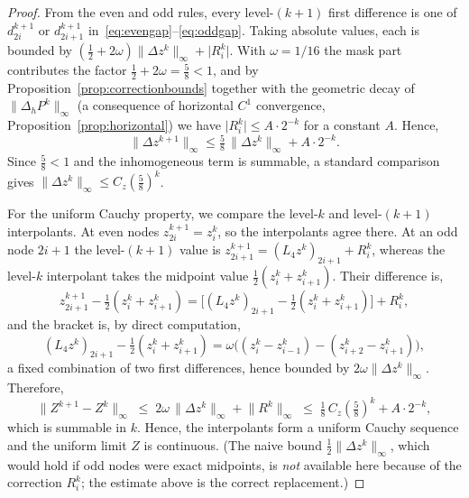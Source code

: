 \documentclass[10pt,a4paper]{amsart}
\newcommand{\Dh}{\Delta_h}
\newcommand{\Lop}{L_4}
\newcommand{\abs}[1]{\lvert #1 \rvert}
\newcommand{\norm}[1]{\lVert #1 \rVert}
\begin{document}
\begin{proof}
From the even and odd rules, every level-$(k+1)$ first difference is one of
$d_{2i}^{k+1}$ or $d_{2i+1}^{k+1}$ in~\eqref{eq:evengap}--\eqref{eq:oddgap}.
Taking absolute values, each is bounded by
$(\tfrac12+2\omega)\norm{\Delta z^k}_\infty+\abs{R_i^k}$. With $\omega=1/16$
the mask part contributes the factor $\tfrac12+2\omega=\tfrac58<1$, and by
Proposition~\ref{prop:correctionbounds} together with the geometric decay of
$\norm{\Dh P^k}_\infty$ (a consequence of horizontal $C^1$ convergence,
Proposition~\ref{prop:horizontal}) we have $\abs{R_i^k}\leq A\cdot 2^{-k}$ for a
constant $A$. Hence,
\[
  \norm{\Delta z^{k+1}}_\infty
  \leq \tfrac58\,\norm{\Delta z^k}_\infty + A\cdot 2^{-k}.
\]
Since $\tfrac58<1$ and the inhomogeneous term is summable, a standard comparison
gives $\norm{\Delta z^k}_\infty\leq C_z(\tfrac58)^k$.

For the uniform Cauchy property, we compare the level-$k$ and level-$(k+1)$
interpolants. At even nodes $z_{2i}^{k+1}=z_i^k$, so the interpolants agree
there. At an odd node $2i+1$ the level-$(k+1)$ value is
$z_{2i+1}^{k+1}=(\Lop z^k)_{2i+1}+R_i^k$, whereas the level-$k$ interpolant
takes the midpoint value $\tfrac12(z_i^k+z_{i+1}^k)$. Their difference is,
\[
  z_{2i+1}^{k+1}-\tfrac12(z_i^k+z_{i+1}^k)
  = \bigl[(\Lop z^k)_{2i+1}-\tfrac12(z_i^k+z_{i+1}^k)\bigr] + R_i^k,
\]
and the bracket is, by direct computation,
\[
  (\Lop z^k)_{2i+1}-\tfrac12(z_i^k+z_{i+1}^k)
  = \omega\bigl((z_i^k-z_{i-1}^k)-(z_{i+2}^k-z_{i+1}^k)\bigr),
\]
a fixed combination of two first differences, hence bounded by
$2\omega\norm{\Delta z^k}_\infty$. Therefore,
\[
  \norm{Z^{k+1}-Z^k}_\infty
  \;\leq\; 2\omega\,\norm{\Delta z^k}_\infty + \norm{R^k}_\infty
  \;\leq\; \tfrac18\,C_z(\tfrac58)^k + A\cdot 2^{-k},
\]
which is summable in $k$. Hence, the interpolants form a uniform Cauchy sequence
and the uniform limit $Z$ is continuous. (The naive bound
$\tfrac12\norm{\Delta z^k}_\infty$, which would hold if odd nodes were exact
midpoints, is \emph{not} available here because of the correction $R_i^k$; the
estimate above is the correct replacement.)
\end{proof}
\end{document}
